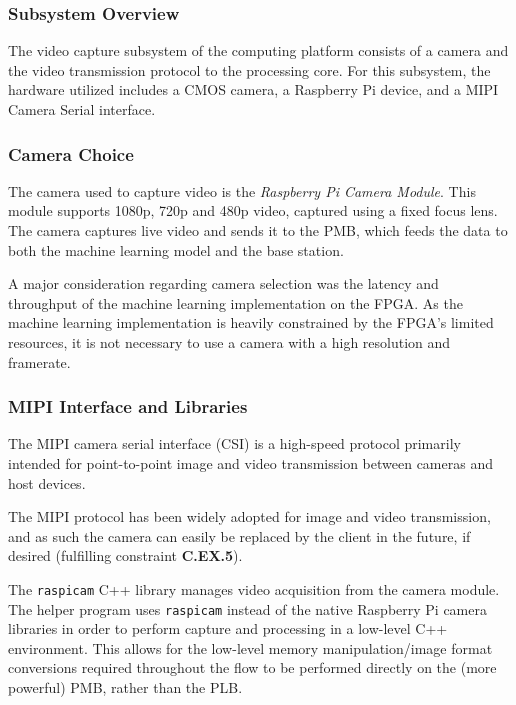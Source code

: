 \subsubsection{Subsystem Overview}
The video capture subsystem of the computing platform consists of a camera and the video transmission protocol to the processing core. For this subsystem, the hardware utilized includes a CMOS camera, a Raspberry Pi device, and a MIPI Camera Serial interface. 

\subsubsection{Camera Choice}
The camera used to capture video is the \textit{Raspberry Pi Camera Module}. This module supports 1080p, 720p and 480p video, captured using a fixed focus lens. The camera captures live video and sends it to the PMB, which feeds the data to both the machine learning model and the base station.

A major consideration regarding camera selection was the latency and throughput of the machine learning implementation on the FPGA. As the machine learning implementation is heavily constrained by the FPGA's limited resources, it is not necessary to use a camera with a high resolution and framerate.

\subsubsection{MIPI Interface and Libraries}
The MIPI camera serial interface (CSI) is a high-speed protocol primarily intended for point-to-point image and video transmission between cameras and host devices. 

The MIPI protocol has been widely adopted for image and video transmission, and as such the camera can easily be replaced by the client in the future, if desired (fulfilling constraint \textbf{C.EX.5}).

The \texttt{raspicam} C++ library manages video acquisition from the camera module. The helper program uses \texttt{raspicam} instead of the native Raspberry Pi camera libraries in order to perform capture and processing in a low-level C++ environment. This allows for the low-level memory manipulation/image format conversions required throughout the flow to be performed directly on the (more powerful) PMB, rather than the PLB.

